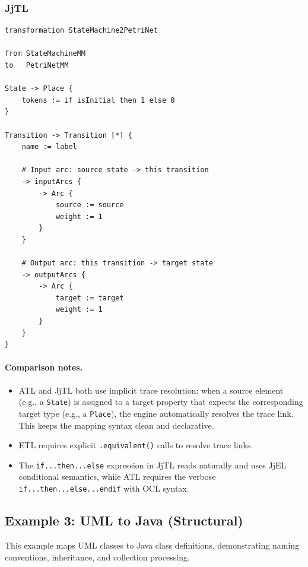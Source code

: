 \documentclass[11pt,a4paper]{article}
\newcommand{\jjel}{\textsf{JjEL}}
\newcommand{\jjtl}{\textsf{JjTL}}
\begin{document}
\subsubsection{JjTL}

\begin{lstlisting}[style=jjtl,caption={StateMachine2PetriNet in JjTL}]
transformation StateMachine2PetriNet

from StateMachineMM
to   PetriNetMM

State -> Place {
    tokens := if isInitial then 1 else 0
}

Transition -> Transition [*] {
    name := label

    # Input arc: source state -> this transition
    -> inputArcs {
        -> Arc {
            source := source
            weight := 1
        }
    }

    # Output arc: this transition -> target state
    -> outputArcs {
        -> Arc {
            target := target
            weight := 1
        }
    }
}
\end{lstlisting}

\paragraph{Comparison notes.}
\begin{itemize}
    \item ATL and \jjtl{} both use implicit trace resolution: when a source element (e.g., a \texttt{State}) is assigned to a target property that expects the corresponding target type (e.g., a \texttt{Place}), the engine automatically resolves the trace link. This keeps the mapping syntax clean and declarative.
    \item ETL requires explicit \texttt{.equivalent()} calls to resolve trace links.
    \item The \texttt{if...then...else} expression in \jjtl{} reads naturally and uses \jjel{} conditional semantics, while ATL requires the verbose \texttt{if...then...else...endif} with OCL syntax.
\end{itemize}


\subsection{Example 3: UML to Java (Structural)}

This example maps UML classes to Java class definitions, demonstrating naming conventions, inheritance, and collection processing.
\end{document}
